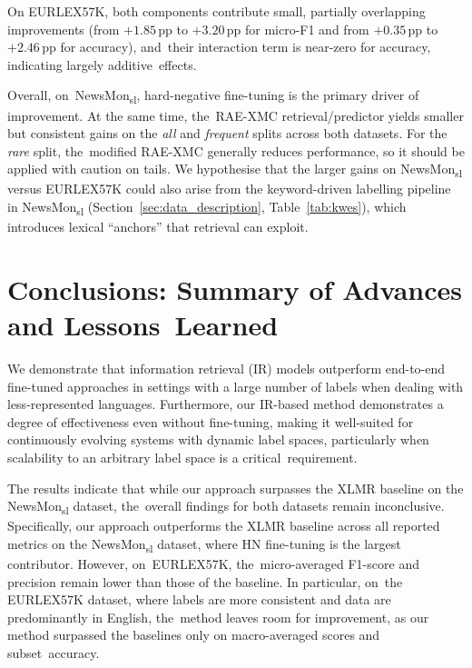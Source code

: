 \documentclass[make,article,accept,pdftex,moreauthors]{Definitions/mdpi}
\begin{document}
On EURLEX57K, both components contribute small, partially overlapping improvements (from \(+1.85\)\,pp to \(+3.20\)\,pp for micro-F1 and from \(+0.35\)\,pp to \(+2.46\)\,pp for accuracy), and~their interaction term is near-zero for accuracy, indicating largely additive~effects. 

Overall, on~NewsMon\textsubscript{sl}, hard-negative fine-tuning is the primary driver of improvement. 
At the same time, the~RAE-XMC retrieval/predictor yields smaller but consistent gains on the \emph{all} and \emph{frequent} splits across both datasets. 
For the \emph{rare} split, the~modified RAE-XMC generally reduces performance, so it should be applied with caution on tails.
We hypothesise that the larger gains on NewsMon\textsubscript{sl} versus EURLEX57K could also arise from the keyword-driven labelling pipeline in NewsMon\textsubscript{sl} (Section~\ref{sec:data_description}, Table~\ref{tab:kwes}), which introduces lexical “anchors” that retrieval can exploit. 

\section{Conclusions: Summary of Advances and Lessons~Learned}
\label{sec:conclusions}

We demonstrate that information retrieval (IR) models outperform end-to-end fine-tuned approaches in settings with a large number of labels when dealing with less-represented languages. Furthermore, our IR-based method demonstrates a degree of effectiveness even without fine-tuning, making it well-suited for continuously evolving systems with dynamic label spaces, particularly when scalability to an arbitrary label space is a critical~requirement.

The results indicate that while our approach surpasses the XLMR baseline on the NewsMon\textsubscript{sl} dataset, the~overall findings for both datasets remain inconclusive. 
Specifically, our approach outperforms the XLMR baseline across all reported metrics on the NewsMon\textsubscript{sl} dataset, where HN fine-tuning is the largest contributor. 
However, on~EURLEX57K, the~micro-averaged F1-score and precision remain lower than those of the baseline. 
In particular, on~the EURLEX57K dataset, where labels are more consistent and data are predominantly in English, the~method leaves room for improvement, as our method surpassed the baselines only on macro-averaged scores and subset~accuracy.
\end{document}
